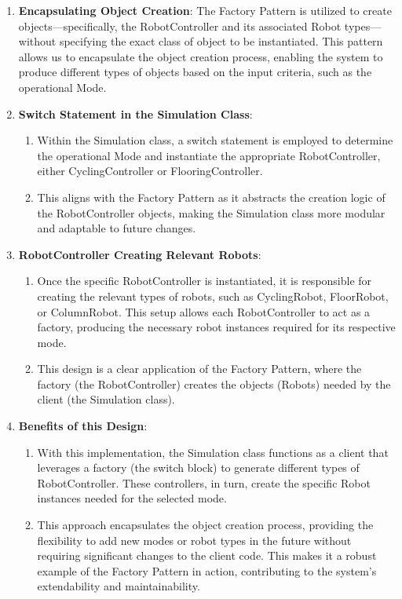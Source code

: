 \documentclass[12pt]{article}
\begin{document}
\begin{enumerate}
    \item \textbf{Encapsulating Object Creation}: The Factory Pattern is utilized to create objects—specifically, the RobotController and its associated Robot types—without specifying the exact class of object to be instantiated. This pattern allows us to encapsulate the object creation process, enabling the system to produce different types of objects based on the input criteria, such as the operational Mode.
    \item \textbf{Switch Statement in the Simulation Class}:
    \begin{enumerate}
        \item Within the Simulation class, a switch statement is employed to determine the operational Mode and instantiate the appropriate RobotController, either CyclingController or FlooringController.
        \item This aligns with the Factory Pattern as it abstracts the creation logic of the RobotController objects, making the Simulation class more modular and adaptable to future changes.
    \end{enumerate}
    \item \textbf{RobotController Creating Relevant Robots}:
    \begin{enumerate}
        \item Once the specific RobotController is instantiated, it is responsible for creating the relevant types of robots, such as CyclingRobot, FloorRobot, or ColumnRobot. This setup allows each RobotController to act as a factory, producing the necessary robot instances required for its respective mode.
        \item This design is a clear application of the Factory Pattern, where the factory (the RobotController) creates the objects (Robots) needed by the client (the Simulation class).
    \end{enumerate}
    \item \textbf{Benefits of this Design}:
    \begin{enumerate}
        \item With this implementation, the Simulation class functions as a client that leverages a factory (the switch block) to generate different types of RobotController. These controllers, in turn, create the specific Robot instances needed for the selected mode.
        \item This approach encapsulates the object creation process, providing the flexibility to add new modes or robot types in the future without requiring significant changes to the client code. This makes it a robust example of the Factory Pattern in action, contributing to the system's extendability and maintainability.
    \end{enumerate}
\end{enumerate}
\end{document}
